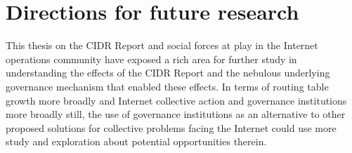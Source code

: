 
%
%
%
%
%
%
%

\section{Directions for future research}
This thesis on the CIDR Report and social forces at play in the Internet
operations community have exposed a rich area for further study in
understanding the effects of the CIDR Report and the nebulous underlying
governance mechanism that enabled these effects. In terms of routing table
growth more broadly and Internet collective action and governance institutions
more broadly still, the use of governance institutions as an alternative to
other proposed solutions for collective problems facing the Internet could use
more study and exploration about potential opportunities therein.

